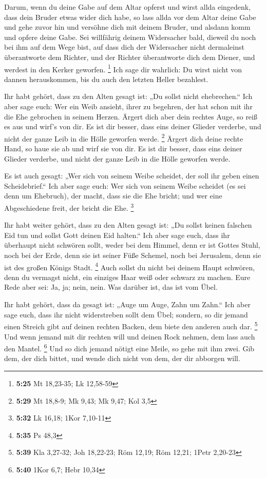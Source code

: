  Darum, wenn du deine Gabe auf dem Altar opferst und
wirst allda eingedenk, dass dein Bruder etwas wider dich habe,
 so lass allda vor dem Altar deine Gabe und gehe zuvor
hin und versöhne dich mit deinem Bruder, und alsdann komm und opfere
deine Gabe.  Sei willfährig deinem Widersacher bald,
dieweil du noch bei ihm auf dem Wege bist, auf dass dich der Widersacher
nicht dermaleinst überantworte dem Richter, und der Richter überantworte
dich dem Diener, und werdest in den Kerker geworfen. \footnote{\textbf{5:25}
  Mt 18,23-35; Lk 12,58-59}  Ich sage dir wahrlich: Du
wirst nicht von dannen herauskommen, bis du auch den letzten Heller
bezahlest.

 Ihr habt gehört, dass zu den Alten gesagt ist: „Du
sollst nicht ehebrechen.``  Ich aber sage euch: Wer ein
Weib ansieht, ihrer zu begehren, der hat schon mit ihr die Ehe gebrochen
in seinem Herzen.  Ärgert dich aber dein rechtes Auge, so
reiß es aus und wirf's von dir. Es ist dir besser, dass eins deiner
Glieder verderbe, und nicht der ganze Leib in die Hölle geworfen werde.
\footnote{\textbf{5:29} Mt 18,8-9; Mk 9,43; Mk 9,47; Kol 3,5}
 Ärgert dich deine rechte Hand, so haue sie ab und wirf
sie von dir. Es ist dir besser, dass eins deiner Glieder verderbe, und
nicht der ganze Leib in die Hölle geworfen werde.

 Es ist auch gesagt: „Wer sich von seinem Weibe scheidet,
der soll ihr geben einen Scheidebrief.``  Ich aber sage
euch: Wer sich von seinem Weibe scheidet (es sei denn um Ehebruch), der
macht, dass sie die Ehe bricht; und wer eine Abgeschiedene freit, der
bricht die Ehe. \footnote{\textbf{5:32} Lk 16,18; 1Kor 7,10-11}

 Ihr habt weiter gehört, dass zu den Alten gesagt ist:
„Du sollst keinen falschen Eid tun und sollst Gott deinen Eid halten.``
 Ich aber sage euch, dass ihr überhaupt nicht schwören
sollt, weder bei dem Himmel, denn er ist Gottes Stuhl, 
noch bei der Erde, denn sie ist seiner Füße Schemel, noch bei Jerusalem,
denn sie ist des großen Königs Stadt. \footnote{\textbf{5:35} Ps 48,3}
 Auch sollst du nicht bei deinem Haupt schwören, denn du
vermagst nicht, ein einziges Haar weiß oder schwarz zu machen.
 Eure Rede aber sei: Ja, ja; nein, nein. Was darüber ist,
das ist vom Übel.

 Ihr habt gehört, dass da gesagt ist: „Auge um Auge, Zahn
um Zahn.``  Ich aber sage euch, dass ihr nicht
widerstreben sollt dem Übel; sondern, so dir jemand einen Streich gibt
auf deinen rechten Backen, dem biete den anderen auch dar. \footnote{\textbf{5:39}
  Kla 3,27-32; Joh 18,22-23; Röm 12,19; Röm 12,21; 1Petr 2,20-23}
 Und wenn jemand mit dir rechten will und deinen Rock
nehmen, dem lass auch den Mantel. \footnote{\textbf{5:40} 1Kor 6,7; Hebr
  10,34}  Und so dich jemand nötigt eine Meile, so gehe
mit ihm zwei.  Gib dem, der dich bittet, und wende dich
nicht von dem, der dir abborgen will.

